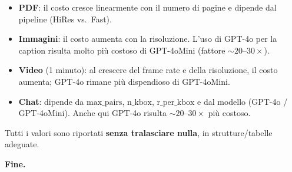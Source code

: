 \documentclass[a4paper,12pt]{article}
\begin{document}
\begin{itemize}
\item \textbf{PDF}: il costo cresce linearmente con il numero di pagine e dipende dal pipeline (HiRes vs.\ Fast).
\item \textbf{Immagini}: il costo aumenta con la risoluzione. L'uso di GPT-4o per la caption risulta molto pi\`u costoso di GPT-4oMini (fattore $\sim 20$--$30\times$).
\item \textbf{Video} (1 minuto): al crescere del frame rate e della risoluzione, il costo aumenta; GPT-4o rimane pi\`u dispendioso di GPT-4oMini.
\item \textbf{Chat}: dipende da \(\text{max\_pairs}\), \(\text{n\_kbox}\), \(\text{r\_per\_kbox}\) e dal modello (GPT-4o / GPT-4oMini). Anche qui GPT-4o risulta $\sim 20$--$30\times$ pi\`u costoso.
\end{itemize}

Tutti i valori sono riportati \textbf{senza tralasciare nulla}, in strutture/tabelle adeguate.

\bigskip
\noindent \textbf{Fine.}
\end{document}
